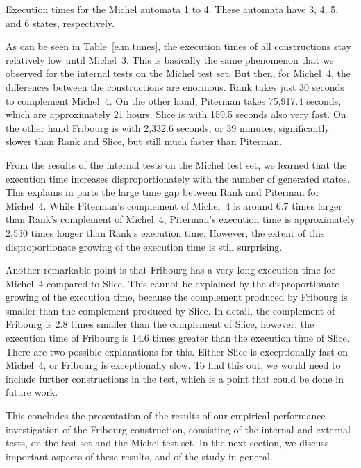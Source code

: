\begin{table}[htb]
\centering

\caption{Execution times for the Michel automata 1 to 4. These automata have 3, 4, 5, and 6 states, respectively.}
\label{e.m.times}
\end{table}

As can be seen in Table~\ref{e.m.times}, the execution times of all constructions stay relatively low until Michel~3. This is basically the same phenomenon that we observed for the internal tests on the Michel test set. But then, for Michel~4, the differences between the constructions are enormous. Rank takes just 30 seconds to complement Michel~4. On the other hand, Piterman takes 75,917.4 seconds, which are approximately 21 hours. Slice is  with 159.5 seconds also very fast. On the other hand Fribourg is with 2,332.6 seconds, or 39 minutes, significantly slower than Rank and Slice, but still much faster than Piterman.

From the results of the internal tests on the Michel test set, we learned that the execution time increases disproportionately with the number of generated states. This explains in parts the large time gap between Rank and Piterman for Michel~4. While Piterman's complement of Michel~4 is around 6.7 times larger than Rank's complement of Michel~4, Piterman's execution time is approximately 2,530 times longer than Rank's execution time. However, the extent of this disproportionate growing of the execution time is still surprising.

Another remarkable point is that Fribourg has a very long execution time for Michel~4 compared to Slice. This cannot be explained by the disproportionate growing of the execution time, because the complement produced by Fribourg is smaller than the complement produced by Slice. In detail, the complement of Fribourg is 2.8 times smaller than the complement of Slice, however, the execution time of Fribourg is 14.6 times greater than the execution time of Slice. There are two possible explanations for this. Either Slice is exceptionally fast on Michel~4, or Fribourg is exceptionally slow. To find this out, we would need to include further constructions in the test, which is a point that could be done in future work.

This concludes the presentation of the results of our empirical performance investigation of the Fribourg construction, consisting of the internal and external tests, on the \goal{} test set and the Michel test set. In the next section, we discuss important aspects of these results, and of the study in general.

